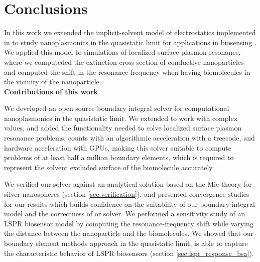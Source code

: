 \chapter{Conclusions}

In this work we extended the implicit-solvent model of electrostatics implemented in \pygbe \cite{CooperClementiBarba2015}
to study nanoplasmonics in the quasistatic limit for applications in biosensing \cite{ClementiETal2017, ClementiETal2019}.
We applied this model to simulations of localized surface plasmon resonance, where we computeded the extinction cross section of 
conductive nanoparticles and computed the shift in the resonance frequency when having biomolecules in the vicinity of the 
nanoparticle.\\

\textbf{Contributions of this work}

We developed an open source boundary integral solver for computational nanoplasmonics in the quasistatic limit. We extended \pygbe to work 
with complex values, and added the functionality needed to solve localized surface plasmon resonance problems. \pygbe 
counts with an algorithmic acceleration with a treecode, and hardware acceleration with GPUs, making this solver 
suitable to compute problems of at least half a million boundary elements, which is required to represent the solvent excluded 
surface of the biomolecule accurately.

We verified our solver against an analytical solution based on the Mie theory for silver nanospheres (section \ref{sec:verification}), and 
presented convergence studies for our results which builds confidence on the suitability of our boundary integral model and the  
correctness of or solver. 
We performed a sensitivity study of an LSPR biosensor model by computing the resonance-frequency shift
while varying the distance between the nanoparticle and the biomolecules. We showed that our boundary element methods approach in
the quasistatic limit, is able to capture the characteristic behavior of LSPR biosensors (section \ref{sec:lspr_response_bsa}).

